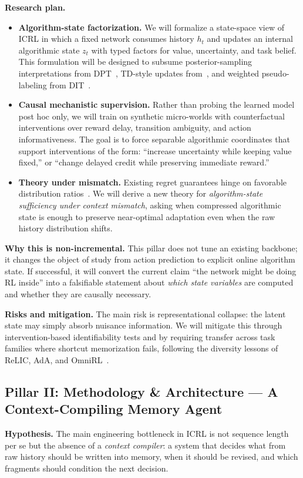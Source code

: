 \documentclass[10pt,twocolumn,letterpaper]{article}
\begin{document}
\textbf{Research plan.}
\begin{itemize}[leftmargin=1.2em]
\item \textbf{Algorithm-state factorization.} We will formalize a state-space view of ICRL in which a fixed network consumes history \(h_t\) and updates an internal algorithmic state \(z_t\) with typed factors for value, uncertainty, and task belief. This formulation will be designed to subsume posterior-sampling interpretations from DPT~\cite{lee2024dpt}, TD-style updates from~\cite{wang2024td}, and weighted pseudo-labeling from DIT~\cite{dong2024dit}.
\item \textbf{Causal mechanistic supervision.} Rather than probing the learned model post hoc only, we will train on synthetic micro-worlds with counterfactual interventions over reward delay, transition ambiguity, and action informativeness. The goal is to force separable algorithmic coordinates that support interventions of the form: ``increase uncertainty while keeping value fixed,'' or ``change delayed credit while preserving immediate reward.''
\item \textbf{Theory under mismatch.} Existing regret guarantees hinge on favorable distribution ratios~\cite{lin2023provableicrl}. We will derive a new theory for \emph{algorithm-state sufficiency under context mismatch}, asking when compressed algorithmic state is enough to preserve near-optimal adaptation even when the raw history distribution shifts.
\end{itemize}

\textbf{Why this is non-incremental.} This pillar does not tune an existing backbone; it changes the object of study from action prediction to explicit online algorithm state. If successful, it will convert the current claim ``the network might be doing RL inside'' into a falsifiable statement about \emph{which state variables} are computed and whether they are causally necessary.

\textbf{Risks and mitigation.} The main risk is representational collapse: the latent state may simply absorb nuisance information. We will mitigate this through intervention-based identifiability tests and by requiring transfer across task families where shortcut memorization fails, following the diversity lessons of ReLIC, AdA, and OmniRL~\cite{elawady2024relic,adaptive2023ada,wang2025omnirl}.

\subsection{Pillar II: Methodology \& Architecture --- A Context-Compiling Memory Agent}
\textbf{Hypothesis.} The main engineering bottleneck in ICRL is not sequence length per se but the absence of a \emph{context compiler}: a system that decides what from raw history should be written into memory, when it should be revised, and which fragments should condition the next decision.
\end{document}
